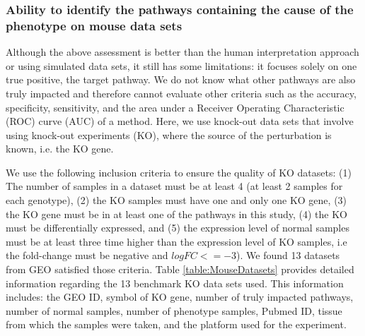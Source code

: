 
\subsubsection{Ability to identify the pathways containing the cause of the phenotype on mouse data sets}
\label{KOsubsubsection}

Although the above assessment is better than the human interpretation approach or using simulated data sets, it still has some limitations: it focuses solely on one true positive, the target pathway. We do not know what other pathways are also truly impacted and therefore cannot evaluate other criteria such as the accuracy, specificity, sensitivity, and the area under a Receiver Operating Characteristic (ROC) curve (AUC) of a method. Here, we use knock-out data sets that involve using knock-out experiments (KO), where the source of the perturbation is known, i.e. the KO gene.

We use the following inclusion criteria to ensure the quality of KO datasets: (1) The number of samples in a dataset must be at least 4 (at least 2 samples for each genotype), (2) the KO samples must have one and only one KO gene, (3) the KO gene must be in at least one of the pathways in this study, (4) the KO must be differentially expressed, and (5) the expression level of normal samples must be at least three time higher than the expression level of KO samples, i.e the fold-change must be negative and $logFC <= -3$).
We found 13 datasets from GEO satisfied those criteria. Table \ref{table:MouseDatasets} provides detailed information regarding the 13 benchmark KO data sets used. This information includes:  the GEO ID, symbol of KO gene, number of truly impacted pathways, number of normal samples, number of phenotype samples, Pubmed ID, tissue from which the samples were taken, and the platform used for the experiment.


